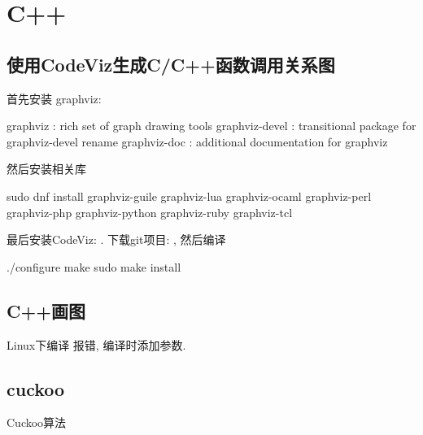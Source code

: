 \chapter{C++}
\section{使用CodeViz生成C/C++函数调用关系图}
首先安装 graphviz: 

\begin{shell}
 graphviz : rich set of graph drawing tools
 graphviz-devel : transitional package for graphviz-devel rename
 graphviz-doc : additional documentation for graphviz
\end{shell}
然后安装相关库
\begin{shell}
sudo dnf install graphviz-guile graphviz-lua graphviz-ocaml graphviz-perl graphviz-php graphviz-python graphviz-ruby graphviz-tcl
\end{shell}
最后安装CodeViz: . 下载git项目: , 
然后编译
\begin{shell}
 ./configure
 make
 sudo make install
\end{shell}


\newpage
\section{C++画图}
Linux下编译
报错, 
编译时添加参数.

\newpage
\section{cuckoo}
Cuckoo算法

\newpage